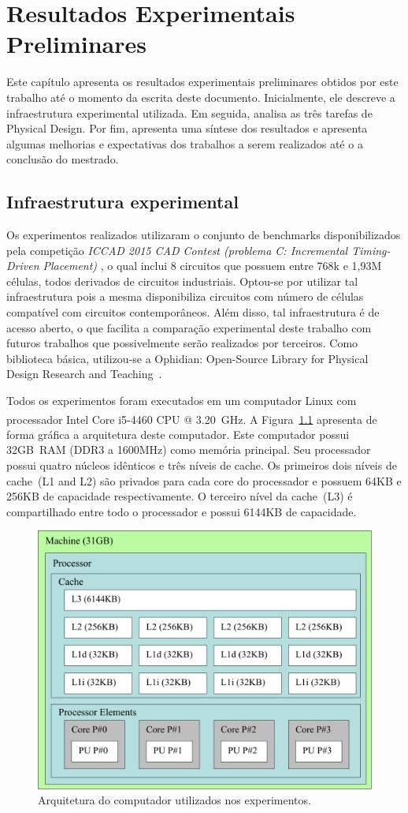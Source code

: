 \chapter{Resultados Experimentais Preliminares}
\label{cap:resultados}

Este capítulo apresenta os resultados experimentais preliminares obtidos por este trabalho até o momento da escrita deste documento. Inicialmente, ele descreve a infraestrutura experimental utilizada. Em seguida, analisa as três tarefas de Physical Design. Por fim, apresenta uma síntese dos resultados e apresenta algumas melhorias e expectativas dos trabalhos a serem realizados até o a conclusão do mestrado.

\section{Infraestrutura experimental}
\label{sec:infraestrutura_experimental}

Os experimentos realizados utilizaram o conjunto de benchmarks disponibilizados pela competição \textit{ICCAD 2015 CAD Contest (problema C: Incremental Timing-Driven Placement)} \cite{kim2015}, o qual inclui 8 circuitos que possuem entre 768k e 1,93M células, todos derivados de circuitos industriais. Optou-se por utilizar tal infraestrutura pois a mesma disponibiliza circuitos com número de células compatível com circuitos contemporâneos. Além disso, tal infraestrutura é de acesso aberto, o que facilita a comparação experimental deste trabalho com futuros trabalhos que possivelmente serão realizados por terceiros. Como biblioteca básica, utilizou-se a Ophidian: Open-Source Library for Physical Design Research and Teaching~\cite{ophidian}.

Todos os experimentos foram executados em um computador Linux com processador Intel\textsuperscript{\textregistered} Core\textsuperscript{\textregistered} i5-4460 CPU @ 3.20~GHz.
A Figura~\ref{fig:architectureMemoryZeus} apresenta de forma gráfica a arquitetura deste computador.
Este computador possui 32GB~RAM (DDR3 a 1600MHz) como memória principal.
Seu processador possui quatro núcleos idênticos e três níveis de cache.
Os primeiros dois níveis de cache~(L1 and L2) são privados para cada core do processador e possuem 64KB e 256KB de capacidade respectivamente.
O terceiro nível da cache~(L3) é compartilhado entre todo o processador e possui 6144KB de capacidade.

\begin{figure}[ht]
    \centering
    \includegraphics[width=0.5\linewidth]{img/results/architectureMemoryZeus.pdf}
    \caption{Arquitetura do computador utilizados nos experimentos.}
    \label{fig:architectureMemoryZeus}
\end{figure}

